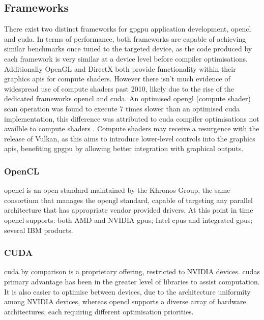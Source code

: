     \subsection{Frameworks}
      There exist two distinct frameworks for \gls{gpgpu} application development, \gls{opencl} and \gls{cuda}. In terms of performance, both frameworks are capable of achieving similar benchmarks once tuned to the targeted device, as the code produced by each framework is very similar at a device level before compiler optimisations.\cite{KDH11, FVS11} Additionally OpenGL and DirectX both provide functionality within their graphics \glspl{api} for compute shaders. However there isn't much evidence of widespread use of compute shaders past 2010, likely due to the rise of the dedicated frameworks \gls{opencl} and \gls{cuda}. An optimised \gls{opengl} (compute shader) scan operation was found to execute 7 times slower than an optimised \gls{cuda} implementation, this difference was attributed to \gls{cuda} compiler optimisations not availble to compute shaders \cite{HSO07}. Compute shaders may receive a resurgence with the release of Vulkan, as this aims to introduce lower-level controls into the graphics \glspl{api}, benefiting \gls{gpgpu} by allowing better integration with graphical outputs.

      \subsubsection*{OpenCL}
        \gls{opencl} is an open standard maintained by the Khronos Group, the same consortium that manages the \gls{opengl} standard, capable of targeting any parallel architecture that has appropriate vendor provided drivers. At this point in time \gls{opencl} supports: both AMD and NVIDIA \glspl{gpu}; Intel \glspl{cpu} and integrated \glspl{gpu}; several IBM products. 

      \subsubsection*{CUDA}
        \gls{cuda} by comparison is a proprietary offering, restricted to NVIDIA devices. \glspl{cuda} primary advantage has been in the greater level of libraries to assist computation. It is also easier to optimise between devices, due to the architecture uniformity among NVIDIA devices, whereas \gls{opencl} supports a diverse array of hardware architectures, each requiring different optimisation priorities.

